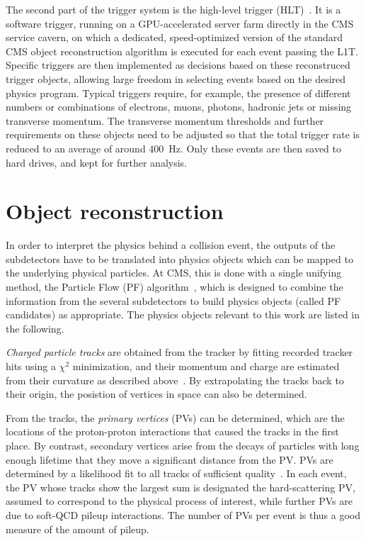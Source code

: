 The second part of the trigger system is the high-level trigger (HLT)~\cite{CMSTrigger:2005yhe,Varghese:20232Q}. It is a software trigger, running on a GPU-accelerated server farm directly in the CMS service cavern, on which a dedicated, speed-optimized version of the standard CMS object reconstruction algorithm is executed for each event passing the L1T. Specific triggers are then implemented as decisions based on these reconstruced trigger objects, allowing large freedom in selecting events based on the desired physics program. Typical triggers require, for example, the presence of different numbers or combinations of electrons, muons, photons, hadronic jets or missing transverse momentum. The transverse momentum thresholds and further requirements on these objects need to be adjusted so that the total trigger rate is reduced to an average of around 400~Hz. Only these events are then saved to hard drives, and kept for further analysis.

\section{Object reconstruction}
\label{sec:methods:reco}

In order to interpret the physics behind a collision event, the outputs of the subdetectors have to be translated into physics objects which can be mapped to the underlying physical particles. At CMS, this is done with a single unifying method, the Particle Flow (PF) algorithm~\cite{CMS:PRF-14-001}, which is designed to combine the information from the several subdetectors to build physics objects (called PF candidates) as appropriate. The physics objects relevant to this work are listed in the following.

\textit{Charged particle tracks} are obtained from the tracker by fitting recorded tracker hits using a $\chi^2$ minimization, and their momentum and charge are estimated from their curvature as described above~\cite{CMS:2014pgm}. 
By extrapolating the tracks back to their origin, the posistion of vertices in space can also be determined. 
    
From the tracks, the \textit{primary vertices} (PVs) can be determined, which are the locations of the proton-proton interactions that caused the tracks in the first place. By contrast, secondary vertices arise from the decays of particles with long enough lifetime that they move a significant distance from the PV. PVs are determined by a likelihood fit to all tracks of sufficient quality~\cite{CMS:2014pgm}. In each event, the PV whose tracks show the largest \pt sum is designated the hard-scattering PV, assumed to correspond to the physical process of interest, while further PVs are due to soft-QCD pileup interactions. The number of PVs per event is thus a good measure of the amount of pileup.
    
